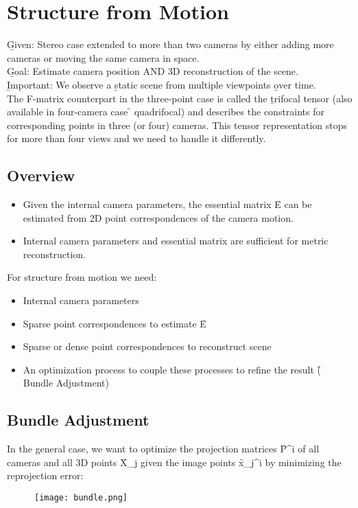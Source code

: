 \section{Structure from Motion}
\b{Given:} Stereo case extended to more than two cameras by either adding more cameras or moving the same camera in space.\\

\b{Goal:} Estimate camera position AND 3D reconstruction of the scene.\\

\b{Important:} We observe a \b{static} scene from multiple viewpoints \b{over time}.\\

The F-matrix counterpart in the three-point case is called the \b{trifocal tensor} (also available in four-camera case \f{\to} quadrifocal) and describes the constraints for corresponding points in three (or four) cameras. This tensor representation stops for more than four views and we need to handle it differently.\\


\subsection{Overview}
\begin{itemize}
    \item Given the internal camera parameters, the essential matrix \f{E} can be estimated from 2D point correspondences of the camera motion.
    \item Internal camera parameters and essential matrix are sufficient for metric reconstruction.
\end{itemize}
For structure from motion we need:
\begin{itemize}
    \item Internal camera parameters
    \item Sparse point correspondences to estimate \f{E}
    \item Sparse or dense point correspondences to reconstruct scene
    \item An optimization process to couple these processes to refine the result (\f{\to} Bundle Adjustment)
\end{itemize}

\subsection{Bundle Adjustment}
In the general case, we want to optimize the projection matrices \f{P^i} of all cameras and all 3D points \f{X_j} given the image points \f{x_j^i} by minimizing the reprojection error:
\begin{figure}[h!]
    \centering
    \texttt{[image: bundle.png]}
\end{figure}

